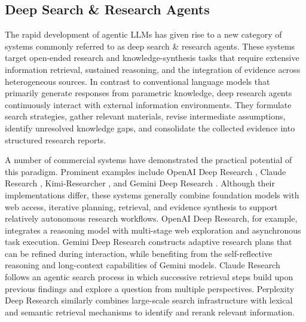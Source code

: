 \documentclass{huawei}
\begin{document}
\subsection{Deep Search \& Research Agents}
The rapid development of agentic LLMs \cite{openai2026, anthropic2026, google2026, xu2026deepseek, qwen2026, zeng2026glm, MiniMaxAI2026, seed2026seed2, kimi2026} has given rise to a new category of systems commonly referred to as deep search \& research agents. These systems target open-ended research and knowledge-synthesis tasks that require extensive information retrieval, sustained reasoning, and the integration of evidence across heterogeneous sources. In contrast to conventional language models \cite{lewis2020retrieval, gao2023retrieval, mei2025survey, liu2025llm4ranking, gong2026cardrewriter, niu2025distributionally, mei2025dense, niu2025addressing, mei2023improving} that primarily generate responses from parametric knowledge, deep research agents continuously interact with external information environments. They formulate search strategies, gather relevant materials, revise intermediate assumptions, identify unresolved knowledge gaps, and consolidate the collected evidence into structured research reports.


A number of commercial systems have demonstrated the practical potential of this paradigm. Prominent examples include OpenAI Deep Research \cite{openai2026}, Claude Research \cite{anthropic2026}, Kimi-Researcher \cite{kimi2026}, and Gemini Deep Research \cite{google2026}. Although their implementations differ, these systems generally combine foundation models with web access, iterative planning, retrieval, and evidence synthesis to support relatively autonomous research workflows. OpenAI Deep Research, for example, integrates a reasoning model with multi-stage web exploration and asynchronous task execution. Gemini Deep Research constructs adaptive research plans that can be refined during interaction, while benefiting from the self-reflective reasoning and long-context capabilities of Gemini models. Claude Research follows an agentic search process in which successive retrieval steps build upon previous findings and explore a question from multiple perspectives. Perplexity Deep Research similarly combines large-scale search infrastructure with lexical and semantic retrieval mechanisms to identify and rerank relevant information.
\end{document}
